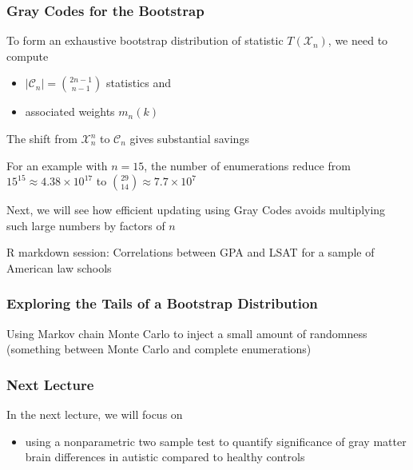 \documentclass[10pt]{beamer}
\begin{document}
\begin{frame}
\frametitle{Gray Codes for the Bootstrap}

To form an exhaustive bootstrap distribution of statistic $T(\mathcal{X}_n)$, \newline
we need to compute  
\begin{itemize}
\item $|\mathcal{C}_n| = \binom{2n-1 }{n-1}$ statistics and 
\item associated weights $m_n(k)$
\end{itemize}

\vspace{0.3cm}
The shift from $\mathcal{X}_n^n$ to $\mathcal{C}_n$ gives substantial savings \newline

For an example with $n = 15$, the number of enumerations reduce from $15^{15} \approx 4.38 \times 10^{17}$ to $\binom{29}{14} \approx 7.7 \times 10^7$ \newline

Next, we will see how efficient updating using Gray Codes avoids multiplying such large numbers by factors of $n$ \newline

\alert{R markdown session:} Correlations between GPA and LSAT for a sample of American law schools

\end{frame}

\begin{frame}
\frametitle{Exploring the Tails of a Bootstrap Distribution}

Using Markov chain Monte Carlo to inject a small amount of randomness (something between Monte Carlo and complete enumerations)



\end{frame}

\begin{frame}
\frametitle{Next Lecture}

In the next lecture, we will focus on
\begin{itemize}
\item using a nonparametric two sample test to quantify significance of gray matter brain differences in autistic compared to healthy controls
\end{itemize}

\end{frame}
\end{document}
